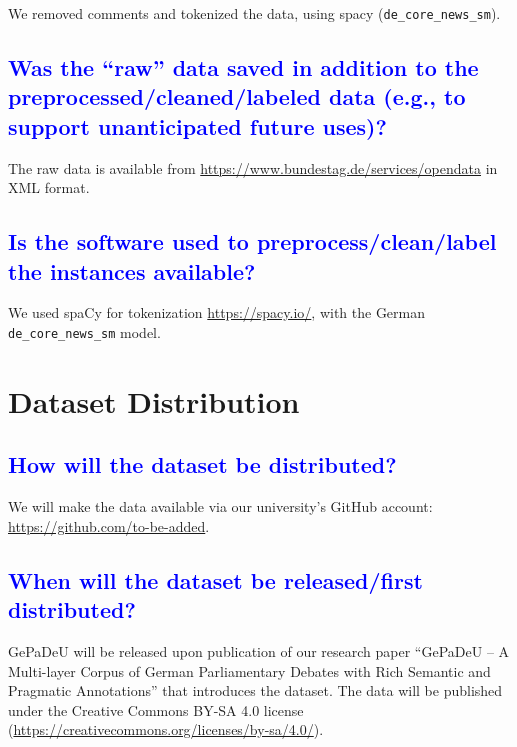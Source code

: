 \documentclass[letterpaper, 10 pt, conference]{ieeeconf}  %
\newcommand{\gepadeu}{{\sc GePaDeU}}
\begin{document}
We removed comments and tokenized the data, using spacy (\texttt{de\_core\_news\_sm}).


\textcolor{blue}{\subsection{Was the “raw” data saved in addition to the preprocessed/cleaned/labeled data (e.g., to support unanticipated future uses)?}} %

The raw data is available from \url{https://www.bundestag.de/services/opendata} in XML format.


\textcolor{blue}{\subsection{Is the software used to preprocess/clean/label the instances available?}} %

We used spaCy for tokenization \url{https://spacy.io/}, with the German \texttt{de\_core\_news\_sm} model.

 

 
\vspace{0.8cm}

\section{Dataset Distribution}

\textcolor{blue}{\subsection{How will the dataset be distributed?}} 
 
We will make the data available  via our university's GitHub account:\\ \url{https://github.com/to-be-added}.



\textcolor{blue}{\subsection{When will the dataset be released/first distributed?}}

\gepadeu{} will be released upon publication of our research paper ``GePaDeU – A Multi-layer Corpus of German Parliamentary Debates with Rich Semantic and Pragmatic Annotations''  that introduces the dataset.
The data will be published under the Creative Commons BY-SA 4.0 license (\url{https://creativecommons.org/licenses/by-sa/4.0/}).
\end{document}
